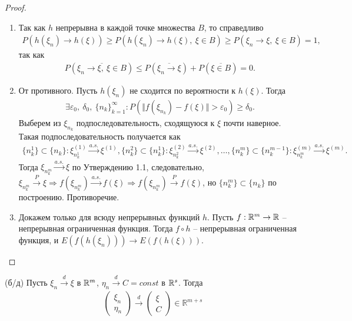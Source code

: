 \begin{proof} ~
	\begin{enumerate}
		\item Так как $h$ непрерывна в каждой точке множества $B$, то справедливо 
		\begin{gather*}
		    P\left(h\left(\xi_n\right) \rightarrow h\left(\xi\right)\right) \ge P\left(h\left(\xi_n\right) \rightarrow h\left(\xi\right),\ \xi \in B\right) \ge P\left(\xi_n \rightarrow \xi,\ \xi \in B\right) = 1,
		\end{gather*}
		так как
		\begin{gather*}
		    P\left(\overline{\xi_n \rightarrow \xi,\ \xi \in B}\right) \le P\left(\overline{\xi_n \rightarrow \xi}\right) + P\left(\overline{\xi \in B}\right) = 0.
		\end{gather*}
		
		\item От противного. Пусть $h\left(\xi_n\right)$ не сходится по вероятности к $h\left(\xi\right)$. Тогда
		\begin{gather*}
		    \exists \varepsilon_0,\ \delta_0,\ \{n_k\}_{k=1}^\infty : P(\Vert f(\xi_{n_k}) - f(\xi)\Vert > \varepsilon_0) \ge \delta_0.
		\end{gather*}
		Выберем из $\xi_{n_k}$ подпоследовательность, сходящуюся к $\xi$ почти наверное. Такая подпоследовательность получается как
		\begin{gather*}
		    \{n_k^1\} \subset \{n_k\}: \xi^{(1)}_{n_k^1} \xrightarrow{a.s.} \xi^{(1)}, \{n_k^2\} \subset \{n_k^1\}: \xi^{(2)}_{n_k^2}\xrightarrow{a.s.} \xi^{(2)},\ldots, \{n_k^m\} \subset \{n_k^{m-1}\}: \xi^{(m)}_{n_k^m}\xrightarrow{a.s.} \xi^{(m)}.
		\end{gather*}
		Тогда $\xi_{n_k^m} \xrightarrow{a.s.} \xi$ по Утверждению 1.1, следовательно, $\xi_{n_k^m} \xrightarrow{P} \xi \Rightarrow f(\xi_{n_k^m}) \xrightarrow{a.s.} f(\xi) \Rightarrow f(\xi_{n_k^m}) \xrightarrow{P} f(\xi)$, но $\{n_k^m\} \subset \{n_k\}$ по построению. Противоречие.
		
		\item Докажем только для всюду непрерывных функций $h$. Пусть $f:\mathbb{R}^m\rightarrow\mathbb{R}$ -- непрерывная ограниченная функция. Тогда $f \circ h$ -- непрерывная ограниченная функция, и $E\left(f\left(h\left(\xi_n\right)\right)\right) \rightarrow E\left(f \left( h\left( \xi\right) \right) \right).$
	\end{enumerate}
\end{proof}

\begin{proposition}
	(б/д) Пусть $\xi_n \xrightarrow{d} \xi$ в $\mathbb{R}^m$, $\eta_n \xrightarrow{d} C = const$ в $\mathbb{R}^s$. Тогда
	\begin{gather*}
	    \begin{pmatrix}
		\xi _{n}\\
		\eta _{n}
    	\end{pmatrix}\xrightarrow{d}
    	\begin{pmatrix}
    		\xi \\
    		C
    	\end{pmatrix} \in \mathbb{R}^{m+s}
	\end{gather*}
\end{proposition}


